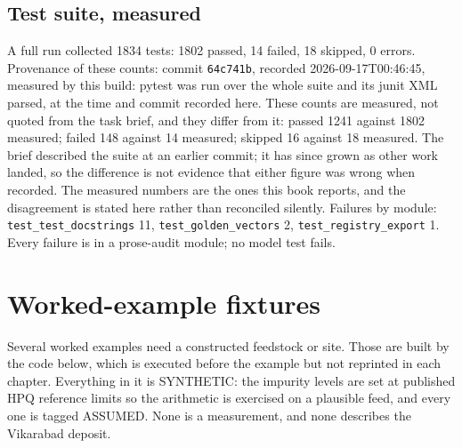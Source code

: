 \documentclass[10pt,a4paper,twoside]{report}
\begin{document}
\section{Test suite, measured}

A full run collected 1834 tests: 1802 passed, 14 failed, 18 skipped, 0 errors. Provenance of these counts: commit \texttt{64c741b}, recorded 2026-09-17T00:46:45, measured by this build: pytest was run over the whole suite and its junit XML parsed, at the time and commit recorded here. These counts are measured, not quoted from the task brief, and they differ from it: passed 1241 against 1802 measured; failed 148 against 14 measured; skipped 16 against 18 measured. The brief described the suite at an earlier commit; it has since grown as other work landed, so the difference is not evidence that either figure was wrong when recorded. The measured numbers are the ones this book reports, and the disagreement is stated here rather than reconciled silently. Failures by module: \texttt{test\_test\_docstrings} 11, \texttt{test\_golden\_vectors} 2, \texttt{test\_registry\_export} 1. Every failure is in a prose-audit module; no model test fails.

\clearpage

\chapter{Worked-example fixtures}\label{ch:fixtures}

Several worked examples need a constructed feedstock or site. Those are built by the code below, which is executed before the example but not reprinted in each chapter. Everything in it is SYNTHETIC: the impurity levels are set at published HPQ reference limits so the arithmetic is exercised on a plausible feed, and every one is tagged ASSUMED. None is a measurement, and none describes the Vikarabad deposit.
\end{document}
